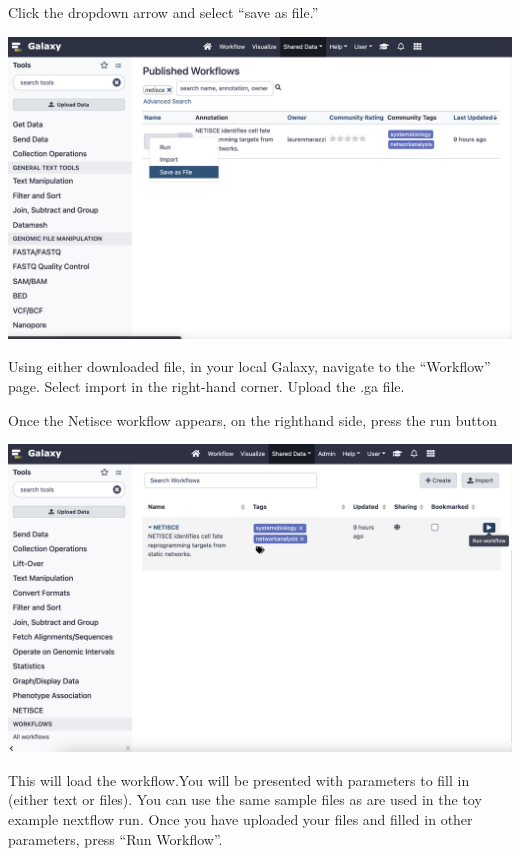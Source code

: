 \documentclass[
]{book}
\begin{document}
Click the dropdown arrow and select ``save as file.''

\begin{center}\includegraphics[width=1\linewidth]{images/galaxy4} \end{center}

Using either downloaded file, in your local Galaxy, navigate to the ``Workflow'' page. Select import in the right-hand corner. Upload the .ga file.

Once the Netisce workflow appears, on the righthand side, press the run button

\begin{center}\includegraphics[width=1\linewidth]{images/galaxy5} \end{center}

This will load the workflow.You will be presented with parameters to fill in (either text or files). You can use the same sample files as are used in the toy example nextflow run. Once you have uploaded your files and filled in other parameters, press ``Run Workflow''.
\end{document}
